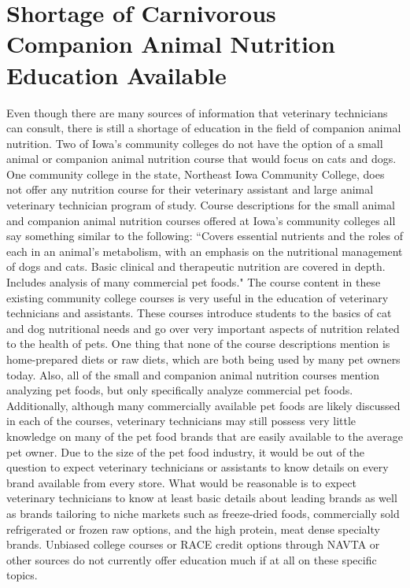 \section{Shortage of Carnivorous Companion Animal Nutrition Education Available}
Even though there are many sources of information that veterinary technicians can consult, there is still a shortage of education in the field of companion animal nutrition. Two of Iowa's community colleges do not have the option of a small animal or companion animal nutrition course that would focus on cats and dogs. One community college in the state, Northeast Iowa Community College, does not offer any nutrition course for their veterinary assistant and large animal veterinary technician program of study\citep{nicc}. Course descriptions for the small animal and companion animal nutrition courses offered at Iowa's community colleges all say something similar to the following: ``Covers essential nutrients and the roles of each in an animal's metabolism, with an emphasis on the nutritional management of dogs and cats. Basic clinical and therapeutic nutrition are covered in depth. Includes analysis of many commercial pet foods."\citep{kcc} The course content in these existing community college courses is very useful in the education of veterinary technicians and assistants. These courses introduce students to the basics of cat and dog nutritional needs and go over very important aspects of nutrition related to the health of pets. One thing that none of the course descriptions mention is home-prepared diets or raw diets, which are both being used by many pet owners today\citep{oconnor}. Also, all of the small and companion animal nutrition courses mention analyzing pet foods, but only specifically analyze commercial pet foods\citep{kcc}. Additionally, although many commercially available pet foods are likely discussed in each of the courses, veterinary technicians may still possess very little knowledge on many of the pet food brands that are easily available to the average pet owner. Due to the size of the pet food industry, it would be out of the question to expect veterinary technicians or assistants to know details on every brand available from every store. What would be reasonable is to expect veterinary technicians to know at least basic details about leading brands as well as brands tailoring to niche markets such as freeze-dried foods, commercially sold refrigerated or frozen raw options, and the high protein, meat dense specialty brands. Unbiased college courses or RACE credit options through NAVTA or other sources do not currently offer education much if at all on these specific topics.

